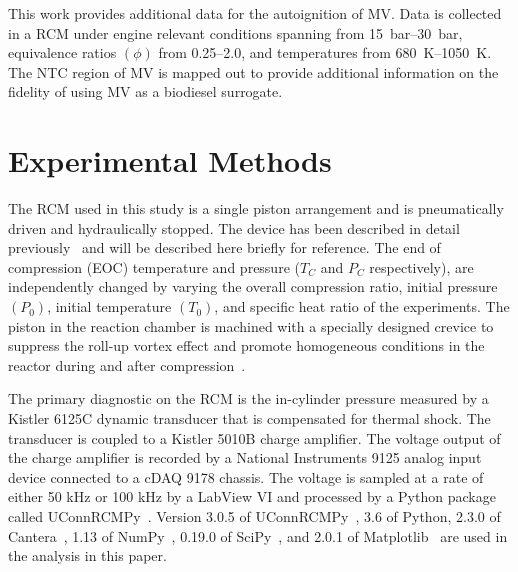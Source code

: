 \documentclass[letterpaper, review, sort&compress]{elsarticle}
\begin{document}
This work provides additional data for the autoignition of MV. Data is collected in a RCM under
engine relevant conditions spanning from \SIrange{15}{30}{\bar}, equivalence ratios \((\phi)\) from
\numrange{0.25}{2.0}, and temperatures from \SIrange{680}{1050}{\K}. The NTC region of MV is mapped
out to provide additional information on the fidelity of using MV as a biodiesel surrogate.

\section{Experimental Methods}\label{sec:experimental-methods}

The RCM used in this study is a single piston arrangement and is pneumatically driven and
hydraulically stopped. The device has been described in detail previously~\cite{Mittal2007a} and
will be described here briefly for reference. The end of compression (EOC) temperature and pressure
(\(T_C\) and \(P_C\) respectively), are independently changed by varying the overall compression
ratio, initial pressure \((P_0)\), initial temperature \((T_0)\), and specific heat ratio of the
experiments. The piston in the reaction chamber is machined with a specially designed crevice to
suppress the roll-up vortex effect and promote homogeneous conditions in the reactor during and
after compression~\cite{Mittal2006}.

The primary diagnostic on the RCM is the in-cylinder pressure measured by a Kistler 6125C dynamic
transducer that is compensated for thermal shock. The transducer is coupled to a Kistler 5010B
charge amplifier. The voltage output of the charge amplifier is recorded by a National Instruments
9125 analog input device connected to a cDAQ 9178 chassis. The voltage is sampled at a rate of
either 50 kHz or 100 kHz by a LabView VI and processed by a Python package called
UConnRCMPy~\cite{Weber2016a}. Version 3.0.5 of UConnRCMPy~\cite{uconnrcmpy}, 3.6 of Python, 2.3.0
of Cantera~\cite{cantera}, 1.13 of NumPy~\cite{vanderWalt2011}, 0.19.0 of SciPy~\cite{Jones2001},
and 2.0.1 of Matplotlib~\cite{Hunter2007} are used in the analysis in this paper.
\end{document}
